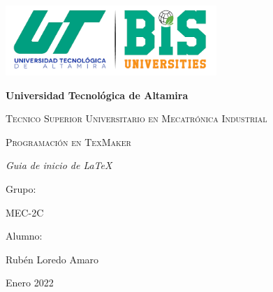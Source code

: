 \documentclass[10pt]{report}
\begin{document}
\begin{titlepage}
\centering
{\includegraphics[width=0.6\textwidth]{LOGOUT.png}\par}
\vspace{1cm}
{\bfseries\LARGE Universidad Tecnológica de Altamira \par}
\vspace{1cm}
{\scshape\Large Tecnico Superior Universitario en Mecatrónica Industrial \par}
\vspace{2cm}
{\scshape\Huge Programación en TexMaker \par}
\vspace{2cm}
{\itshape\Huge Guia de inicio de \LaTeX \par}
\vfill
{\Large Grupo: \par}
{\Large MEC-2C \par}
\vfill
{\Large Alumno: \par}
{\Large Rubén Loredo Amaro \par}
\vfill
{\Large Enero 2022 \par}
\end{titlepage}
\end{document}
